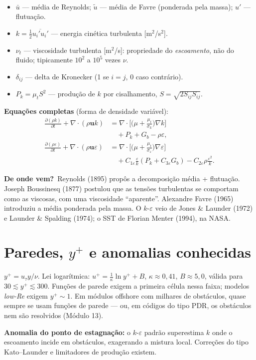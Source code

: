 \documentclass[10pt,a4paper,twocolumn,openany]{report}
\newcommand{\lead}[2]{\par\medskip\noindent{\color{#1}\bfseries #2}\ }
\newenvironment{conceito}[1]{\section{#1}}{\par}
\newenvironment{dicionario}[1][Dicionário da equação]{\lead{azul}{#1.}\small}{\par\medskip}
\newcommand{\origem}{\par\smallskip\noindent\textcolor{azul}{\textbf{De onde vem?}}\ }
\begin{document}
\begin{dicionario}[Dicionário da equação: RANS e $k$-$\varepsilon$]
\begin{itemize}[leftmargin=*,nosep]
  \item $\bar u$ --- média de Reynolds; $\tilde u$ --- média de Favre
        (ponderada pela massa); $u'$ --- flutuação.
  \item $k=\tfrac12\overline{u_i'u_i'}$ --- energia cinética turbulenta [m$^2$/s$^2$].
  \item $\nu_t$ --- viscosidade turbulenta [m$^2$/s]: propriedade do
        \emph{escoamento}, não do fluido; tipicamente $10^2$ a $10^5$ vezes $\nu$.
  \item $\delta_{ij}$ --- delta de Kronecker (1 se $i=j$, 0 caso contrário).
  \item $P_k=\mu_t S^2$ --- produção de $k$ por cisalhamento, $S=\sqrt{2S_{ij}S_{ij}}$.
\end{itemize}
\textbf{Equações completas} (forma de densidade variável):
\begin{align*}
  \frac{\partial(\rho k)}{\partial t}+\nabla\cdot(\rho\mathbf u k)
  &=\nabla\cdot\Big[\Big(\mu+\frac{\mu_t}{\sigma_k}\Big)\nabla k\Big]\\
  &\quad+P_k+G_b-\rho\varepsilon,\\
  \frac{\partial(\rho\varepsilon)}{\partial t}+\nabla\cdot(\rho\mathbf u\varepsilon)
  &=\nabla\cdot\Big[\Big(\mu+\frac{\mu_t}{\sigma_\varepsilon}\Big)\nabla\varepsilon\Big]\\
  &\quad+C_{1\varepsilon}\frac{\varepsilon}{k}\left(P_k+C_{3\varepsilon}G_b\right)
   -C_{2\varepsilon}\rho\frac{\varepsilon^2}{k}.
\end{align*}
\origem Reynolds (1895) propôs a decomposição média + flutuação. Joseph
Boussinesq (1877) postulou que as tensões turbulentas se comportam como as
viscosas, com uma viscosidade ``aparente''. Alexandre Favre (1965) introduziu
a média ponderada pela massa. O $k$-$\varepsilon$ veio de Jones \& Launder
(1972) e Launder \& Spalding (1974); o SST de Florian Menter (1994), na NASA.
\end{dicionario}


\begin{conceito}{Paredes, $y^+$ e anomalias conhecidas}
$y^+ = u_\tau y/\nu$. Lei logarítmica: $u^+ = \frac{1}{\kappa}\ln y^+ + B$,
$\kappa\approx0{,}41$, $B\approx5{,}0$, válida para $30\lesssim y^+\lesssim
300$. Funções de parede exigem a primeira célula nessa faixa; modelos
\emph{low-Re} exigem $y^+\sim1$. Em módulos offshore com milhares de
obstáculos, quase sempre se usam funções de parede --- ou, em códigos do
tipo PDR, os obstáculos nem são resolvidos (Módulo 13).

\textbf{Anomalia do ponto de estagnação:} o $k$-$\varepsilon$ padrão
superestima $k$ onde o escoamento incide em obstáculos, exagerando a mistura
local. Correções do tipo Kato--Launder e limitadores de produção existem.
\end{conceito}
\end{document}
